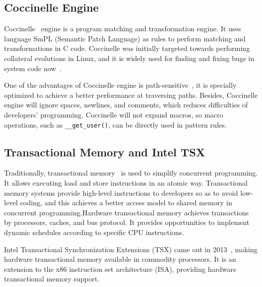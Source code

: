 \documentclass[10pt]{llncs}
\begin{document}
\subsection{Coccinelle Engine}
\label{back2}

Coccinelle~\cite{Jones2007The,Stuart2008Hunting} engine is a program matching and transformation engine. It uses language SmPL (Semantic Patch Language) as rules to perform matching and transformations in C code. Coccinelle was initially targeted towards performing collateral evolutions in Linux, and it is widely used for finding and fixing bugs in system code now~\cite{lawall2010finding}.

One of the advantages of Coccinelle engine is path-sensitive~\cite{Jones2007The}, it is specially optimized to achieve a better performance at traversing paths. Besides, Coccinelle engine will ignore spaces, newlines, and comments, which reduces difficulties of developers' programming. Coccinelle will not expand macros, so macro operations, such as \verb:__get_user():, can be directly used in pattern rules.

\subsection{Transactional Memory and Intel TSX}
\label{back3}
Traditionally, transactional memory~\cite{Herlihy1993Transactional,Harris2010Transactional,Hammond2004Transactional,Karnagel2014Improving} is used to simplify concurrent programming. It allows executing load and store instructions in an atomic way. Transactional memory systems provide high-level instructions to developers so as to avoid low-level coding, and this achieves a better access model to shared memory in concurrent programming.Hardware transactional memory achieves transactions by processors, caches, and bus protocol. It provides opportunities to implement dynamic schedules according to specific CPU instructions.

Intel Transactional Synchronization Extensions (TSX) came out in 2013~\cite{Yoo2014Performance,Haas2014Enhancing,Goel2014Performance}, making hardware transactional memory available in commodity processors. It is an extension to the x86 instruction set architecture (ISA), providing hardware transactional memory support.
\end{document}
